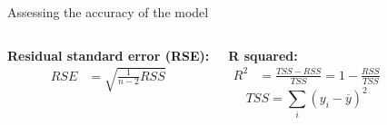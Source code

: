 \documentclass[aspectratio=169,usenames,dvipsnames]{beamer}
\newcommand{\InstructorNotes}[1]{\textit{\color{orange}#1}}
\newcommand{\InstructorList}[1]{
\begin{itemize}
	\color{orange}
	#1
\end{itemize}
}
\renewcommand{\InstructorNotes}[1]{}
\renewcommand{\InstructorList}[1]{}
\begin{document}
\begin{frame}[c]{Assessing the accuracy of the model}
	\centering
\begin{columns}
\textbf{Residual standard error (RSE):}
\begin{align*}
	RSE &= \sqrt{ \frac{1}{n-2} RSS}\\
\end{align*}
\InstructorNotes{an estimate of $\sigma$. \\also measure lack of fit? ($MSE=RSS/n$) }




\textbf{R squared:}
\begin{align*}
	R^2 &= \frac{TSS-RSS}{TSS} = 1-\frac{RSS}{TSS}
\end{align*}
\begin{equation*}
	TSS = \sum_i (y_i - \overline y)^2
\end{equation*}
\InstructorList{
\item TSS = total sum of squares
\item Proportion in [0,1]; variability in $Y$ that can be explained using $X$
\item 0 means $Y$ not explained by linear regression on $X$}
\end{columns}
\vspace{\fill}

\end{frame}



\end{document}
